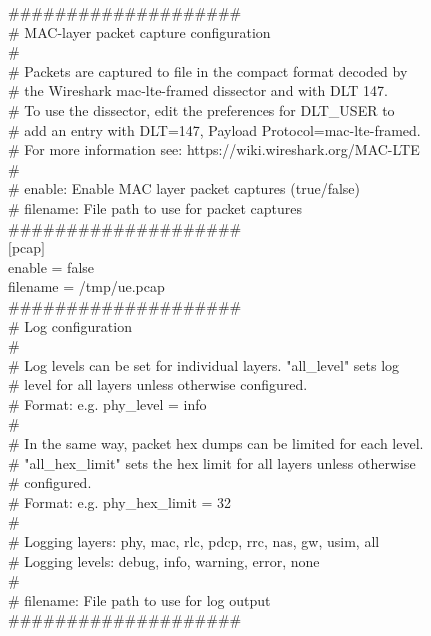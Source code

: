   
\#\#\#\#\#\#\#\#\#\#\#\#\#\#\#\#\#\#\#\#  \\
\# MAC-layer packet capture configuration  \\
\#  \\
\# Packets are captured to file in the compact format decoded by   \\
\# the Wireshark mac-lte-framed dissector and with DLT 147.   \\
\# To use the dissector, edit the preferences for DLT\_USER to   \\
\# add an entry with DLT=147, Payload Protocol=mac-lte-framed.  \\
\# For more information see: https://wiki.wireshark.org/MAC-LTE  \\
\#  \\
\# enable:   Enable MAC layer packet captures (true/false)  \\
\# filename: File path to use for packet captures  \\
\#\#\#\#\#\#\#\#\#\#\#\#\#\#\#\#\#\#\#\#  \\

$[$pcap$]$  \\
enable = false  \\
filename = /tmp/ue.pcap  \\
  
\#\#\#\#\#\#\#\#\#\#\#\#\#\#\#\#\#\#\#\#  \\
\# Log configuration  \\
\#  \\
\# Log levels can be set for individual layers. "all\_level" sets log  \\
\# level for all layers unless otherwise configured.  \\
\# Format: e.g. phy\_level = info  \\
\#  \\
\# In the same way, packet hex dumps can be limited for each level.  \\
\# "all\_hex\_limit" sets the hex limit for all layers unless otherwise  \\
\# configured.  \\
\# Format: e.g. phy\_hex\_limit = 32  \\
\#  \\
\# Logging layers: phy, mac, rlc, pdcp, rrc, nas, gw, usim, all  \\
\# Logging levels: debug, info, warning, error, none  \\
\#  \\
\# filename: File path to use for log output  \\
\#\#\#\#\#\#\#\#\#\#\#\#\#\#\#\#\#\#\#\#  \\

